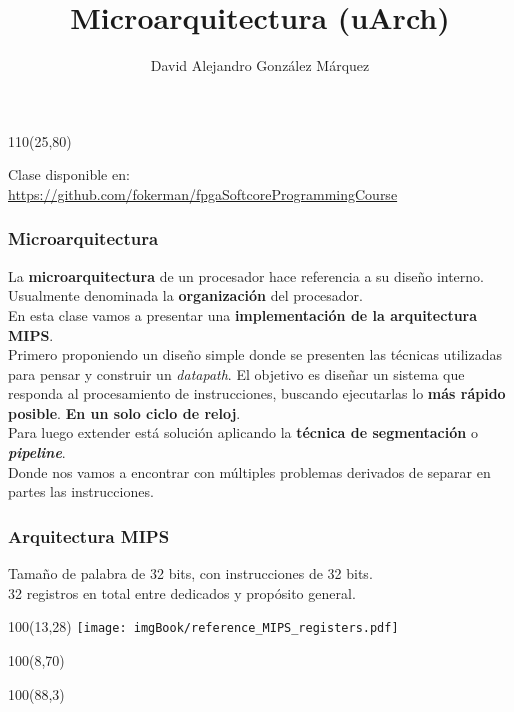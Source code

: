 \documentclass[aspectratio=169]{beamer}
\title{\Huge Microarquitectura (uArch)}
\author{David Alejandro González Márquez}
\date{}
\begin{document}
\begin{frame}[plain]
    \titlepage
    \begin{textblock}{110}(25,80)
    \begin{tcolorbox}[size=small,width=\textwidth,colback={gray!30},title={}]
    \begin{center}
     \scriptsize Clase disponible en: \url{https://github.com/fokerman/fpgaSoftcoreProgrammingCourse}
    \end{center}
    \end{tcolorbox}
    \end{textblock}
\end{frame}

\begin{frame}[t,fragile]
    \frametitle{Microarquitectura}
    La \textbf{microarquitectura} de un procesador hace referencia a su diseño interno.\\
    \textcolor{verdeuca}{Usualmente denominada la \textbf{organización} del procesador.}\\
    \bigskip
    \pause
    \bigskip
    En esta clase vamos a presentar una \textbf{implementación de la arquitectura MIPS}.\\
    \bigskip
    \pause
    Primero proponiendo un diseño simple donde se presenten las técnicas utilizadas para pensar y construir un \emph{datapath}.
    \pause
    \textcolor{verdeuca}{El objetivo es diseñar un sistema que responda al procesamiento de instrucciones, buscando ejecutarlas lo \textbf{más rápido posible}.}
    \textcolor{naranjauca}{\textbf{En un solo ciclo de reloj}.}\\
    \bigskip
    \pause
    Para luego extender está solución aplicando la \textbf{técnica de segmentación} o \textcolor{naranjauca}{\textbf{\emph{pipeline}}}.\\
    \pause
    \textcolor{verdeuca}{Donde nos vamos a encontrar con múltiples problemas derivados de separar en partes las instrucciones.}
\end{frame}

\begin{frame}[t,fragile]
    \frametitle{Arquitectura MIPS}
    \footnotesize
    Tamaño de palabra de 32 bits, con instrucciones de 32 bits.\\
    32 registros en total entre dedicados y propósito general.\\
    \begin{textblock}{100}(13,28)
    \texttt{[image: imgBook/reference\_MIPS\_registers.pdf]}
    \end{textblock}
    \begin{textblock}{100}(8,70)
    \end{textblock}
    \begin{textblock}{100}(88,3)
    \end{textblock} 
\end{frame}
\end{document}

